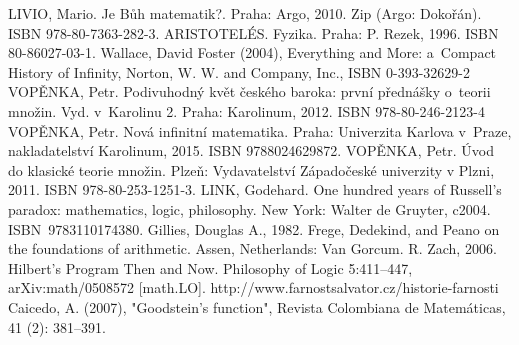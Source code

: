 \documentclass[czech]{article}
\begin{document}
\begin{thebibliography}{}

    LIVIO, Mario. Je Bůh matematik?. Praha: Argo, 2010. Zip (Argo: Dokořán). ISBN 978-80-7363-282-3.
    ARISTOTELÉS. Fyzika. Praha: P. Rezek, 1996. ISBN 80-86027-03-1.
    Wallace, David Foster (2004), Everything and More: a~Compact History of Infinity, Norton, W. W. and Company, Inc., ISBN 0-393-32629-2
    VOPĚNKA, Petr. Podivuhodný květ českého baroka: první přednášky o~teorii množin. Vyd. v~Karolinu 2. Praha: Karolinum, 2012. ISBN 978-80-246-2123-4
    VOPĚNKA, Petr. Nová infinitní matematika. Praha: Univerzita Karlova v~Praze, nakladatelství Karolinum, 2015. ISBN 9788024629872.    
    VOPĚNKA, Petr. Úvod do klasické teorie množin. Plzeň: Vydavatelství Západočeské univerzity v Plzni, 2011. ISBN 978-80-253-1251-3.
    LINK, Godehard. One hundred years of Russell's paradox: mathematics, logic, philosophy. New York: Walter de Gruyter, c2004. ISBN~9783110174380.   
    Gillies, Douglas A., 1982. Frege, Dedekind, and Peano on the foundations of arithmetic. Assen, Netherlands: Van Gorcum.
    R. Zach, 2006. Hilbert's Program Then and Now. Philosophy of Logic 5:411–447, arXiv:math/0508572 [math.LO].
    http://www.farnostsalvator.cz/historie-farnosti
    Caicedo, A. (2007), "Goodstein's function", Revista Colombiana de Matemáticas, 41 (2): 381–391.

\end{thebibliography}
\end{document}
